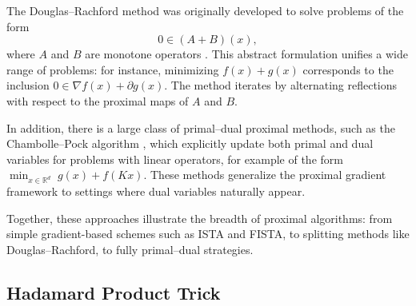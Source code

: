 \documentclass[11pt, twoside]{report}
\begin{document}
The Douglas--Rachford method was originally developed to solve problems of the form 
\[
    0 \in (A+B)(x),
\]
where $A$ and $B$ are monotone operators \cite{douglas1956numerical}. This abstract formulation unifies a wide range of problems: for instance, minimizing $f(x)+g(x)$ corresponds to the inclusion $0 \in \nabla f(x) + \partial g(x)$. The method iterates by alternating reflections with respect to the proximal maps of $A$ and $B$.

In addition, there is a large class of primal--dual proximal methods, such as the Chambolle--Pock algorithm \cite{chambolle2011first}, which explicitly update both primal and dual variables for problems with linear operators, for example of the form $\min_{x \in \mathbb{R}^d} \; g(x) + f(Kx)$. These methods generalize the proximal gradient framework to settings where dual variables naturally appear.

Together, these approaches illustrate the breadth of proximal algorithms: from simple gradient-based schemes such as ISTA and FISTA, to splitting methods like Douglas--Rachford, to fully primal--dual strategies.



\subsection{Hadamard Product Trick} \label{subsec: hada}

\end{document}
